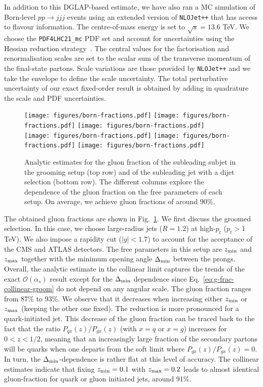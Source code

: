 \documentclass[a4paper,11pt]{article}
\newcommand{\zmin}{z_{\rm{min}}}
\newcommand{\zmax}{z_{\rm{max}}}
\begin{document}
In addition to this DGLAP-based estimate, we have also ran a MC simulation of Born-level $pp\to jjj$ events using an extended version of \texttt{NLOJet++} that has access to flavour information. The centre-of-mass energy is set to $\sqrt{s}=13.6$ TeV. We choose the \texttt{PDF4LHC21\_mc} PDF set and account for uncertainties using the Hessian reduction strategy~\cite{PDF4LHCWorkingGroup:2022cjn}. The central values for the factorisation and renormalisation scales are set to the scalar sum of the transverse momentum of the final-state partons. Scale variations are those provided by \texttt{NLOJet++} and we take the envelope to define the scale uncertainty. The total perturbative uncertainty of our exact fixed-order result is obtained by adding in quadrature the scale and PDF uncertainties. 

\begin{figure}
    \centering
  \texttt{[image: figures/born-fractions.pdf]}
 \texttt{[image: figures/born-fractions.pdf]}
 \texttt{[image: figures/born-fractions.pdf]} \\
     \texttt{[image: figures/born-fractions.pdf]}
   \texttt{[image: figures/born-fractions.pdf]}
   \texttt{[image: figures/born-fractions.pdf]} 
    \caption{Analytic estimates for the gluon fraction of the subleading subjet in the grooming setup (top row) and of the subleading jet with a dijet selection (bottom row). The different columns explore the dependence of the gluon fraction on the free parameters of each setup. On average, we achieve gluon fractions of around $90\%$.}
    \label{fig:gfrac-analytics}
\end{figure}

The obtained gluon fractions are shown in Fig.~\ref{fig:gfrac-analytics}. We first discuss the groomed selection. In this case, we choose large-radius jets ($R=1.2$) at high-$p_t$ ($p_t> 1$ TeV). We also impose a rapidity cut ($|y|<1.7$) to account for the acceptance of the CMS and ATLAS detectors. The free parameters in this setup are $\zmin$ and $\zmax$ together with the minimum opening angle $\Delta_{\rm min}$ between the prongs. Overall, the analytic estimate in the collinear limit captures the trends of the exact $\mathcal{O}(\alpha_s)$ result except for the $\Delta_{\rm min}$ dependence since Eq.~\eqref{eq:g-frac-collinear-groom} do not depend on any angular scale. The gluon fraction ranges from 87\% to 93\%. We observe that it decreases when increasing either $\zmin$ or $\zmax$ (keeping the other one fixed). The reduction is more pronounced for a quark-initiated jet. This decrease of the gluon fraction can be traced back to the fact that the ratio $P_{qx}(z)/P_{gx}(z)$ (with $x=q$ or $x=g$) increases for $0<z<1/2$, meaning that an increasingly large fraction of the secondary partons will be quarks when one departs from the soft limit where $P_{qx}(z)/P_{gx}(z)=0$.
%
In turn, the $\Delta_{\rm min}$-dependence is rather flat at this level of accuracy. The collinear estimates indicate that fixing $\zmin=0.1$ with $\zmax=0.2$ leads to almost identical gluon-fraction for quark or gluon initiated jets, around 91\%.   
\end{document}
